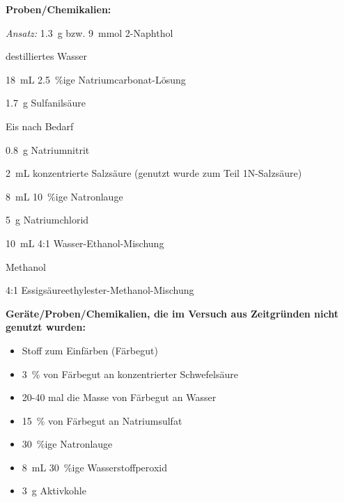 \textbf{Proben/Chemikalien:}
\begin{itemize}
	\begin{minipage}{0.55 \textwidth}
		\item \textit{Ansatz:} \SI{1,3}{\gram} bzw. \SI{9}{\milli \mol} 2-Naphthol
		\item destilliertes Wasser
		\item \SI{18}{\milli \liter} \SI{2,5}{\percent}ige Natriumcarbonat-Lösung
		\item \SI{1,7}{\gram} Sulfanilsäure
		\item Eis nach Bedarf
		\item \SI{0,8}{\gram} Natriumnitrit
	\end{minipage}
	\begin{minipage}{0.45 \textwidth}
		\item \SI{2}{\milli \liter} konzentrierte Salzsäure (genutzt wurde zum Teil 1N-Salzsäure)
		\item \SI{8}{\milli \liter} \SI{10}{\percent}ige Natronlauge
		\item \SI{5}{\gram} Natriumchlorid
		\item \SI{10}{\milli \liter} 4:1 Wasser-Ethanol-Mischung
		\item Methanol
		\item 4:1 Essigsäureethylester-Methanol-Mischung
	\end{minipage}
\end{itemize}

\vspace*{5mm}

\textbf{Geräte/Proben/Chemikalien, die im Versuch aus Zeitgründen nicht genutzt wurden:}
\begin{itemize}
	\item Stoff zum Einfärben (Färbegut)
	\item \SI{3}{\percent} von  Färbegut an konzentrierter Schwefelsäure
	\item 20-40 mal die Masse von Färbegut an Wasser
	\item \SI{15}{\percent} von  Färbegut an Natriumsulfat
	\item \SI{30}{\percent}ige Natronlauge
	\item \SI{8}{\milli \liter} \SI{30}{\percent}ige Wasserstoffperoxid
	\item \SI{3}{\gram} Aktivkohle
\end{itemize}



